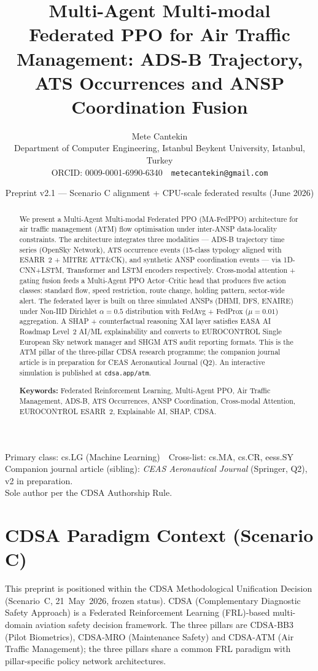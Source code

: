 \documentclass[11pt]{article}
\title{\bfseries Multi-Agent Multi-modal Federated PPO for Air Traffic Management: ADS-B Trajectory, ATS Occurrences and ANSP Coordination Fusion}
\author{Mete Cantekin\\[2pt]
\normalsize Department of Computer Engineering, Istanbul Beykent University, Istanbul, Turkey\\
\normalsize ORCID: 0009-0001-6990-6340 \,\textperiodcentered\, \texttt{metecantekin@gmail.com}}
\date{Preprint v2.1 --- Scenario C alignment + CPU-scale federated results (June 2026)}
\begin{document}
\maketitle

\begin{center}\small
Primary class: cs.LG (Machine Learning) \,\textperiodcentered\, Cross-list: cs.MA, cs.CR, eess.SY\\
Companion journal article (sibling): \emph{CEAS Aeronautical Journal} (Springer, Q2), v2 in preparation.\\
Sole author per the CDSA Authorship Rule.
\end{center}

\begin{abstract}
\noindent We present a Multi-Agent Multi-modal Federated PPO (MA-FedPPO) architecture for air traffic management (ATM) flow optimisation under inter-ANSP data-locality constraints. The architecture integrates three modalities --- ADS-B trajectory time series (OpenSky Network), ATS occurrence events (15-class typology aligned with ESARR~2 + MITRE ATT\&CK), and synthetic ANSP coordination events --- via 1D-CNN+LSTM, Transformer and LSTM encoders respectively. Cross-modal attention + gating fusion feeds a Multi-Agent PPO Actor--Critic head that produces five action classes: standard flow, speed restriction, route change, holding pattern, sector-wide alert. The federated layer is built on three simulated ANSPs (DHMI, DFS, ENAIRE) under Non-IID Dirichlet $\alpha=0.5$ distribution with FedAvg + FedProx ($\mu=0.01$) aggregation. A SHAP + counterfactual reasoning XAI layer satisfies EASA AI Roadmap Level~2 AI/ML explainability and converts to EUROCONTROL Single European Sky network manager and SHGM ATS audit reporting formats. This is the ATM pillar of the three-pillar CDSA research programme; the companion journal article is in preparation for CEAS Aeronautical Journal (Q2). An interactive simulation is published at \texttt{cdsa.app/atm}.

\medskip
\noindent\textbf{Keywords:} Federated Reinforcement Learning, Multi-Agent PPO, Air Traffic Management, ADS-B, ATS Occurrences, ANSP Coordination, Cross-modal Attention, EUROCONTROL ESARR~2, Explainable AI, SHAP, CDSA.
\end{abstract}

\section*{CDSA Paradigm Context (Scenario C)}
This preprint is positioned within the CDSA Methodological Unification Decision (Scenario~C, 21~May~2026, frozen status). CDSA (Complementary Diagnostic Safety Approach) is a Federated Reinforcement Learning (FRL)-based multi-domain aviation safety decision framework. The three pillars are CDSA-BB3 (Pilot Biometrics), CDSA-MRO (Maintenance Safety) and CDSA-ATM (Air Traffic Management); the three pillars share a common FRL paradigm with pillar-specific policy network architectures.
\end{document}
